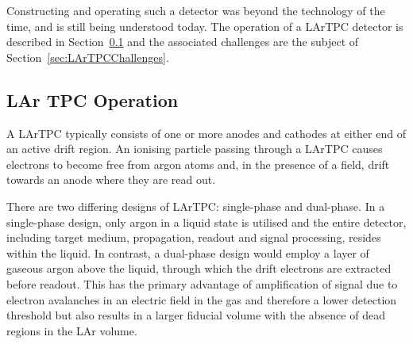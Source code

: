 Constructing and operating such a detector was beyond the technology of the time, and is still being understood today.  The operation of a LArTPC detector is described in Section~\ref{sec:LArTPCOperation} and the associated challenges are the subject of Section~\ref{sec:LArTPCChallenges}.

\subsection{LAr TPC Operation}\label{sec:LArTPCOperation}

A LArTPC typically consists of one or more anodes and cathodes at either end of an active drift region.  An ionising particle passing through a LArTPC causes electrons to become free from argon atoms and, in the presence of a field, drift towards an anode where they are read out.

There are two differing designs of LArTPC: single-phase and dual-phase.  In a single-phase design, only argon in a liquid state is utilised and the entire detector, including target medium, propagation, readout and signal processing, resides within the liquid.  In contrast, a dual-phase design would employ a layer of gaseous argon above the liquid, through which the drift electrons are extracted before readout.  This has the primary advantage of amplification of signal due to electron avalanches in an electric field in the gas and therefore a lower detection threshold but also results in a larger fiducial volume with the absence of dead regions in the LAr volume.

